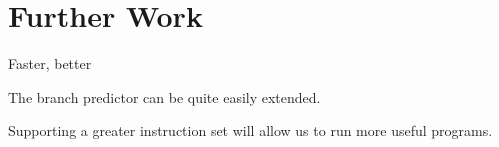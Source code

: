 \section{Further Work}
Faster, better

The branch predictor can be quite easily extended.

Supporting a greater instruction set will allow us to run more useful programs.

